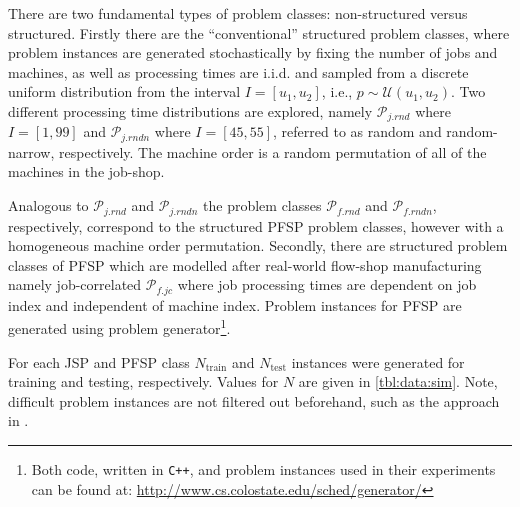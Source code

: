 \documentclass[graybox]{svmult}
\begin{document}
There are two fundamental types of problem classes: non-structured versus 
structured. 
Firstly there are the ``conventional'' structured problem classes, where 
problem instances are generated stochastically by fixing the number of jobs and 
machines, as well as processing times are i.i.d. and sampled from a discrete 
uniform distribution from the interval $I=[u_1,u_2]$, i.e., $p\sim 
\mathcal{U}(u_1,u_2)$.
Two different processing time distributions are explored, namely 
$\mathcal{P}_{j.rnd}$ where $I=[1,99]$ and $\mathcal{P}_{j.rndn}$ where 
$I=[45,55]$, referred to as random and random-narrow, respectively.
The machine order is a random permutation of all of the machines in the 
job-shop. 

Analogous to $\mathcal{P}_{j.rnd}$ and $\mathcal{P}_{j.rndn}$ the problem 
classes $\mathcal{P}_{f.rnd}$ and $\mathcal{P}_{f.rndn}$, respectively, 
correspond to the structured PFSP problem classes, however with a homogeneous 
machine order permutation.  
Secondly, there are structured problem classes of PFSP which are modelled after 
real-world flow-shop manufacturing namely job-correlated $\mathcal{P}_{f.jc}$ 
where job processing times are dependent on job index and independent of 
machine index.
Problem instances for PFSP are generated using \cite{Whitley} problem 
generator\footnote{Both code, written in \texttt{C++}, and problem instances 
    used in their experiments can be found at: 
    \url{http://www.cs.colostate.edu/sched/generator/}}. 

For each JSP and PFSP class $N_{\text{train}}$  and $N_{\text{test}}$ instances 
were generated for training and testing, respectively. Values for $N$ are given 
in \cref{tbl:data:sim}. Note, difficult problem instances are not filtered out 
beforehand, such as the approach in \cite{Whitley}. 
\end{document}
